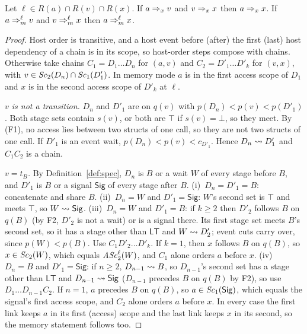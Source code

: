 \begin{lemma}[Transitivity]\label{lem:trans}
Let $\ell \in R(a) \cap R(v) \cap R(x)$. If $a \Rightarrow_{x} v$ and $v \Rightarrow_{x} x$ then $a \Rightarrow_{x} x$. If $a \Rightarrow_{m}^{\ell} v$ and $v
\Rightarrow_{m}^{\ell} x$ then $a \Rightarrow_{m}^{\ell} x$.
\end{lemma}
\begin{proof}
Host order is transitive, and a host event before (after) the first (last) host dependency of a chain is in its
scope, so host-order steps compose with chains. Otherwise take chains $C_1 = D_1 \dots D_n$ for $(a,v)$ and $C_2 =
D'_1 \dots D'_k$ for $(v,x)$, with $v \in \mathit{Sc}_{2}(D_n) \cap \mathit{Sc}_{1}(D'_1)$. In memory mode $a$ is in the first access
scope of $D_1$ and $x$ is in the second access scope of $D'_k$ at $\ell$.

\emph{$v$ is not a transition.} $D_n$ and $D'_1$ are on $q(v)$ with $p(D_n) < p(v) < p(D'_1)$. Both stage sets contain
$s(v)$, or both are $\top$ if $s(v) = \bot$, so they meet. By (F1), no access lies between two structs of one call, so
they are not two structs of one call. If $D'_1$ is an event wait, $p(D_n) < p(v) < c_{D'_1}$. Hence $D_n \rightsquigarrow
D'_1$ and $C_1C_2$ is a chain.

\emph{$v = t_B$.} By Definition~\ref{def:spec}, $D_n$ is $B$ or a wait $W$ of every stage before $B$, and $D'_1$ is $B$
or a signal $\mathsf{Sig}$ of every stage after $B$. (i)~$D_n = D'_1 = B$: concatenate and share $B$. (ii)~$D_n = W$ and
$D'_1 = \mathsf{Sig}$: $W$'s second set is $\top$ and meets $\top$, so $W \rightsquigarrow \mathsf{Sig}$. (iii)~$D_n = W$ and
$D'_1 = B$: if $k \ge 2$ then $D'_2$ follows $B$ on $q(B)$ (by F2, $D'_2$ is not a wait) or is a signal there. Its
first stage set meets $B$'s second set, so it has a stage other than $\mathsf{LT}$ and $W \rightsquigarrow D'_2$; event cuts
carry over, since $p(W) < p(B)$. Use $C_1 D'_2 \dots D'_k$. If $k = 1$, then $x$ follows $B$ on $q(B)$, so $x \in
\mathit{Sc}_{2}(W)$, which equals $\mathit{ASc}_{2}^{\ell}(W)$, and $C_1$ alone orders $a$ before $x$. (iv)~$D_n = B$ and $D'_1 =
\mathsf{Sig}$: if $n \ge 2$, $D_{n-1} \rightsquigarrow B$, so $D_{n-1}$'s second set has a stage other than $\mathsf{LT}$ and
$D_{n-1} \rightsquigarrow \mathsf{Sig}$ ($D_{n-1}$ precedes $B$ on $q(B)$ by F2), so use $D_1 \dots D_{n-1} C_2$. If $n = 1$,
$a$ precedes $B$ on $q(B)$, so $a \in \mathit{Sc}_{1}(\mathsf{Sig})$, which equals the signal's first access scope, and $C_2$
alone orders $a$ before $x$. In every case the first link keeps $a$ in its first (access) scope and the last link keeps
$x$ in its second, so the memory statement follows too.


\end{proof}
